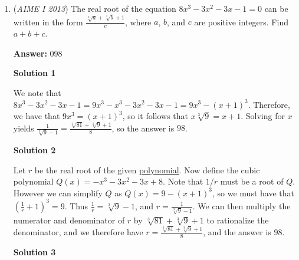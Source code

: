\begin{enumerate}
 



\textbf{Solution 4}

We can see that the middle square must be red to allow the outer $4$ triominoes to satisfy the problem condition. We realize that each triomino must have one red square and $2$ purple squares. We observe that once we choose the pattern for one triomino, the rest of the triominoes will be determined. There are $3$ ways to color the triominoes in a favorable way, and $13$ choose $8$ total ways to color them. This gives the probability of coloring the triominoes in a favorable way to be $\frac{3}{1278}=\frac{1}{429}$. So our answer is $n=\boxed{429}$.

 


	\item (\textit{AIME I 2013}) The real root of the equation $8x^3-3x^2-3x-1=0$ can be written in the form $\frac{\sqrt[3]{a}+\sqrt[3]{b}+1}{c}$, where $a$, $b$, and $c$ are positive integers. Find $a+b+c$.


 



 
 \textbf{Answer: }098



\textbf{Solution 1}

We note that $8x^3 - 3x^2 - 3x - 1 = 9x^3 - x^3 - 3x^2 - 3x - 1 = 9x^3 - (x + 1)^3$. Therefore, we have that $9x^3 = (x+1)^3$, so it follows that $x\sqrt[3]{9} = x+1$. Solving for $x$ yields $\frac{1}{\sqrt[3]{9}-1} = \frac{\sqrt[3]{81}+\sqrt[3]{9}+1}{8}$, so the answer is $\boxed{98}$.

 



\textbf{Solution 2}

Let $r$ be the real root of the given \href{https://artofproblemsolving.com/wiki/index.php?title=Polynomial}{polynomial}. Now define the cubic polynomial $Q(x)=-x^3-3x^2-3x+8$. Note that $1/r$ must be a root of $Q$. However we can simplify $Q$ as $Q(x)=9-(x+1)^3$, so we must have that $(\frac{1}{r}+1)^3=9$. Thus $\frac{1}{r}=\sqrt[3]{9}-1$, and $r=\frac{1}{\sqrt[3]{9}-1}$. We can then multiply the numerator and denominator of $r$ by $\sqrt[3]{81}+\sqrt[3]{9}+1$ to rationalize the denominator, and we therefore have $r=\frac{\sqrt[3]{81}+\sqrt[3]{9}+1}{8}$, and the answer is $\boxed{98}$.

 



\textbf{Solution 3}


\end{enumerate}
